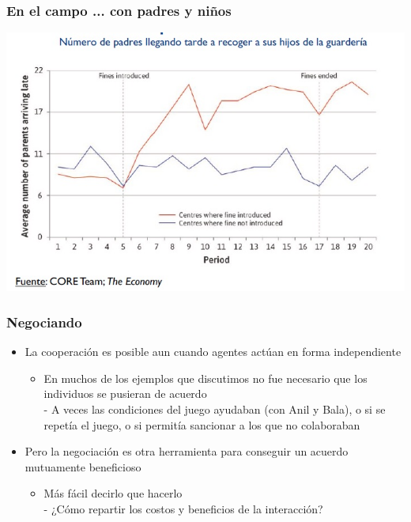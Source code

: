 \documentclass{beamer}
\begin{document}
\begin{frame}
\frametitle{ En el campo ... con padres y niños}
\centering
\includegraphics[scale=0.6]{Slides Principios de Economia/Figures/Tema_03_28_guarderia.jpg}
\end{frame}

\begin{frame}
\frametitle{Negociando}
\begin{itemize}
    \item La cooperación es posible aun cuando agentes 
    actúan en forma independiente
    \begin{itemize}
        \item En muchos de los ejemplos que discutimos no fue necesario que los individuos se pusieran de acuerdo \\
        - A veces las condiciones del juego ayudaban (con Anil y Bala), o si se repetía el juego, o si permitía sancionar a los que no colaboraban
    \end{itemize}
    \item Pero la negociación es otra herramienta para conseguir un acuerdo mutuamente beneficioso
    \begin{itemize}
        \item Más fácil decirlo que hacerlo \\
        - ¿Cómo repartir los costos y beneficios de la interacción?
    \end{itemize}
\end{itemize}
\end{frame}
\end{document}

